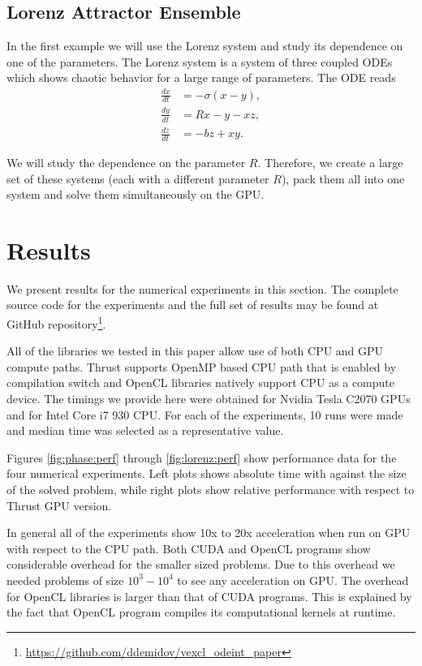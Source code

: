 \documentclass[1p]{elsarticle}
\begin{document}
\subsection{Lorenz Attractor Ensemble}

In the first example we will use the Lorenz system and study its dependence on
one of the parameters. The Lorenz system is a system of three coupled ODEs
which shows chaotic behavior for a large range of parameters. The ODE reads
\begin{align}
    \frac{dx}{dt} &= -\sigma \left( x - y \right), \\
    \frac{dy}{dt} &= R x - y - xz, \\
    \frac{dz}{dt} &= -bz + xy.
\end{align}

We will study the dependence on the parameter $R$. Therefore, we create a large
set of these systems (each with a different parameter $R$), pack them all into
one system and solve them simultaneously on the GPU.

\section{Results}

We present results for the numerical experiments in this section. The complete
source code for the experiments and the full set of results may be found at
GitHub
repository\footnote{\href{https://github.com/ddemidov/vexcl_odeint_paper}{https://github.com/ddemidov/vexcl\_odeint\_paper}}.

All of the libraries we tested in this paper allow use of both CPU and GPU
compute paths. Thrust supports OpenMP based CPU path that is enabled by
compilation switch and OpenCL libraries natively support CPU as a compute
device.  The timings we provide here were obtained for Nvidia Tesla C2070 GPUs
and for Intel Core i7 930 CPU. For each of the experiments, 10 runs were made
and median time was selected as a representative value.

Figures \ref{fig:phase:perf} through \ref{fig:lorenz:perf} show performance
data for the four numerical experiments. Left plots shows absolute time with
against the size of the solved problem, while right plots show relative
performance with respect to Thrust GPU version.

In general all of the experiments show 10x to 20x acceleration when run on GPU
with respect to the CPU path. Both CUDA and OpenCL programs show considerable
overhead for the smaller sized problems. Due to this overhead we needed
problems of size $10^3-10^4$ to see any acceleration on GPU. The overhead for
OpenCL libraries is larger than that of CUDA programs. This is explained by the
fact that OpenCL program compiles its computational kernels at runtime.
\end{document}
